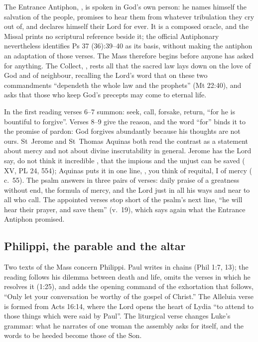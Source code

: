 The Entrance Antiphon, , is spoken
in God's own person: he names himself the salvation of the people, promises to
hear them from whatever tribulation they cry out of, and declares himself
their Lord for ever. It is a composed oracle, and the Missal prints no
scriptural reference beside it; the official Antiphonary nevertheless
identifies Ps 37 (36):39--40 as its basis, without making the antiphon an
adaptation of those verses. The Mass therefore begins before anyone has asked for anything. The
Collect, , rests all that the
sacred law lays down on the love of God and of neighbour, recalling the Lord's
word that on these two commandments ``dependeth the whole law and the
prophets'' (Mt 22:40), and asks that those who keep God's precepts may come to
eternal life.

In the first reading verses 6--7 summon: seek, call, forsake, return, ``for he is bountiful to
forgive''. Verses 8--9 give the reason, and the word ``for'' binds it to the
promise of pardon: God forgives abundantly because his thoughts are not ours.
St~Jerome and St~Thomas Aquinas both read the contrast as a statement about
mercy and not about divine inscrutability in general. Jerome has the Lord say,
do not think it incredible , that the
impious and the unjust can be saved ( XV, PL 24, 554); Aquinas
puts it in one line, , you
think of requital, I of mercy ( c.~55). The psalm answers in
three pairs of verses: daily praise of a greatness without end, the formula of
mercy, and the Lord just in all his ways and near to all who call. The appointed verses stop short of the psalm's next line, ``he will hear their
prayer, and save them'' (v.~19), which says again what the Entrance Antiphon
promised.

\pagebreak
\subsection{Philippi, the parable and the altar}

Two texts of the Mass concern Philippi. Paul writes in chains (Phil 1:7, 13);
the reading follows his dilemma between death and life,
omits the verses in which he resolves it (1:25), and adds the opening command
of the exhortation that follows, ``Only let your conversation be worthy of the
gospel of Christ.'' The Alleluia verse is formed from Acts 16:14, where the
Lord opens the heart of Lydia ``to attend to those things which were said by
Paul''. The liturgical verse changes Luke's grammar: what he narrates of one woman the
assembly asks for itself, and the words to be heeded become those of the Son.

